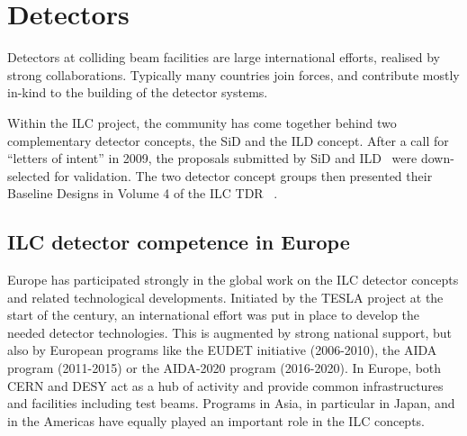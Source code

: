 \documentclass[%
 reprint,
 floatfix,
 amsmath,amssymb,
 aps,
]{revtex4-1}
\begin{document}
\section{\label{sec:det}Detectors}

Detectors at colliding beam facilities are large international efforts, realised by strong collaborations. 
Typically many countries join forces, and contribute mostly in-kind to the building of the detector systems. 

Within the ILC project, the community has come together behind two complementary detector concepts, the SiD and the ILD concept. 
After a call for ``letters of intent'' in 2009, the proposals submitted by SiD and ILD~\cite{Aihara:2009ad,Abe:2010aa} were down-selected for validation. The two detector concept 
groups then presented their Baseline Designs in Volume 4 of the ILC TDR ~\cite{Behnke:2013lya}.

\subsection{ILC detector competence in Europe~\label{sec:det:competence}}
Europe has participated strongly in the global work on the ILC detector concepts and 
related technological developments. Initiated by the TESLA project at the start 
of the century, an international effort was put in place to develop the needed 
detector technologies. This is augmented by strong national support, but also by 
European programs like the EUDET initiative (2006-2010), the AIDA program 
(2011-2015) or the AIDA-2020 program (2016-2020). In Europe, both CERN and DESY 
act as a hub of activity and provide common infrastructures and facilities 
including test beams. Programs in Asia, in particular in Japan, and in the 
Americas have equally played an important role in the ILC concepts. 

\end{document}
